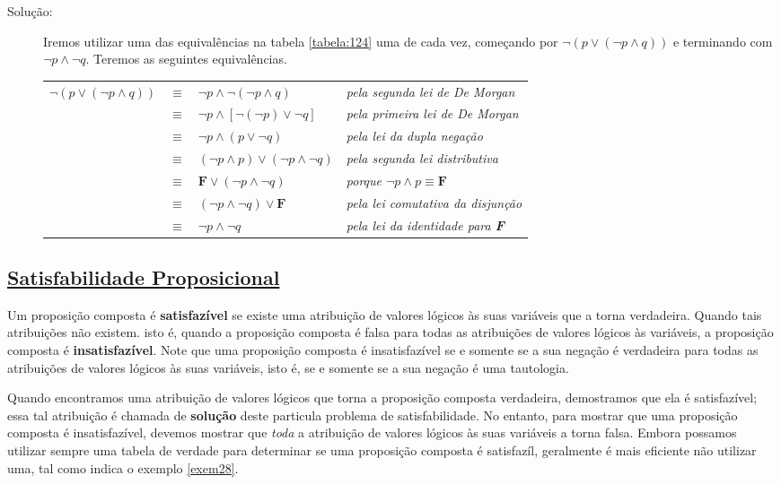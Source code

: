 \begin{description}
\item[Solução:] Iremos utilizar uma das equivalências na tabela \ref{tabela:124}
uma de cada vez, começando por $\lnot (p \lor (\lnot p \land q))$ e terminando
com $\lnot p \land \lnot q$. Teremos as seguintes equivalências.

\begin{table}[H]
	\centering
	\begin{tabular}{rcll}%
	$\lnot (p \lor (\lnot p \land q))$ & $\equiv$ & $\lnot p \land \lnot (\lnot p
	\land q)$ & \emph{pela segunda lei de De Morgan}\\
	 & $\equiv$ & $\lnot p \land [\lnot(\lnot p) \lor \lnot q]$ & \emph{pela
	 primeira lei de De Morgan}\\	
	& $\equiv$ & $\lnot p \land (p \lor \lnot q)$ & \emph{pela lei da dupla
	negação}\\
	& $\equiv$ & $(\lnot p \land p) \lor (\lnot p \land \lnot q)$ & \emph{pela
	segunda lei distributiva}\\
	& $\equiv$ & $\textbf{F} \lor (\lnot p \land \lnot q)$ & \emph{porque $\lnot
	p \land p \equiv \textbf{F}$}\\
	& $\equiv$ & $(\lnot p \land \lnot q) \lor \textbf{F}$ & \emph{pela lei
	comutativa da disjunção}\\
	& $\equiv$ & $\lnot p \land \lnot q$ & \emph{pela lei da identidade para
	\textbf{F}}
	
	\end{tabular}%
\end{table}
\end{description}

\subsection*{\underline{Satisfabilidade Proposicional}}

Um proposição composta é \textbf{satisfazível} se existe uma atribuição de
valores lógicos às suas variáveis que a torna verdadeira. Quando tais
atribuições não existem. isto é, quando a proposição composta é falsa para todas
as atribuições de valores lógicos às variáveis, a proposição composta é
\textbf{insatisfazível}. Note que uma proposição composta é insatisfazível se e
somente se a sua negação é verdadeira para todas as atribuições de valores
lógicos às suas variáveis, isto é, se e somente se a sua negação é uma
tautologia.

Quando encontramos uma atribuição de valores lógicos que torna a proposição
composta verdadeira, demostramos que ela é satisfazível; essa tal atribuição é
chamada de \textbf{solução} deste particula problema de satisfabilidade. No
entanto, para mostrar que uma proposição composta é insatisfazível, devemos
mostrar que \emph{toda} a atribuição de valores lógicos às suas variáveis a
torna falsa. Embora possamos utilizar sempre uma tabela de verdade para
determinar se uma proposição composta é satisfazíl, geralmente é mais eficiente
não utilizar uma, tal como indica o exemplo \ref{exem28}.

